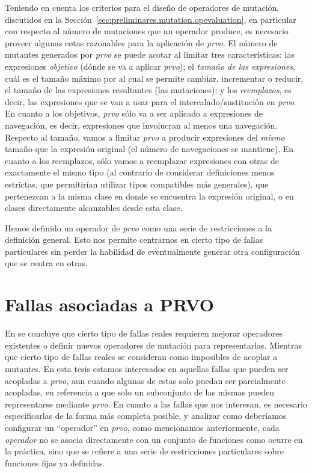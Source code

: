 Teniendo en cuenta los criterios para el dise\~no de operadores de mutaci\'on, discutidos en la Secci\'on~\ref{sec:preliminares.mutation.opevaluation}, en particular con respecto al n\'umero de mutaciones que un operador produce, es necesario proveer algunas cotas razonables para la aplicaci\'on de \emph{prvo}. El n\'umero de mutantes generados por \emph{prvo} se puede acotar al limitar tres caracter\'isticas: las expresiones \emph{objetivo} (d\'onde se va a aplicar \emph{prvo}); el \emph{tama\~no de las expresiones}, cu\'al es el tama\~no m\'aximo por al cual se permite cambiar, incrementar o reducir, el tama\~no de las expresiones resultantes (las mutaciones); y los \emph{reemplazos}, es decir, las expresiones que se van a usar para el intercalado/sustituci\'on en \emph{prvo}. En cuanto a los objetivos, \emph{prvo} s\'olo va a ser aplicado a expresiones de navegaci\'on, es decir, expresiones que involucran al menos una navegaci\'on. Respecto al tama\~no, vamos a limitar \emph{prvo} a producir expresiones del \emph{mismo} tama\~no que la expresi\'on original (el n\'umero de navegaciones se mantiene). En cuanto a los reemplazos, s\'olo vamos a reemplazar expresiones con otras de exactamente el mismo tipo (al contrario de considerar definiciones menos estrictas, que permitir\'ian utilizar tipos compatibles m\'as generales), que pertenezcan a la misma clase en donde se encuentra la expresi\'on original, o en clases directamente alcanzables desde esta clase.

Hemos definido un operador de \emph{prvo} como una serie de restricciones a la definici\'on general. Esto nos permite centrarnos en cierto tipo de fallas particulares sin perder la habilidad de eventualmente generar otra configuraci\'on que se centra en otras.

\section{Fallas asociadas a PRVO}
\label{sec:prvo.prvoTargetedFaults}

En \cite{bibliography.mutation.evaluation.valid-substitute} se concluye que cierto tipo de fallas reales requieren mejorar operadores existentes o definir nuevos operadores de mutaci\'on para representarlas. Mientras que cierto tipo de fallas reales se consideran como imposibles de acoplar a mutantes. En esta tesis estamos interesados en aquellas fallas que pueden ser acopladas a \emph{prvo}, aun cuando algunas de estas solo puedan ser parcialmente acopladas, en referencia a que solo un subconjunto de las mismas pueden representarse mediante \emph{prvo}. En cuanto a las fallas que nos interesan, es necesario especificarlas de la forma m\'as completa posible, y analizar como deber\'iamos configurar un ``operador'' en \emph{prvo}, como mencionamos anteriormente, cada \emph{operador} no se asocia directamente con un conjunto de funciones como ocurre en la pr\'actica, sino que se refiere a una serie de restricciones particulares sobre funciones fijas ya definidas.

